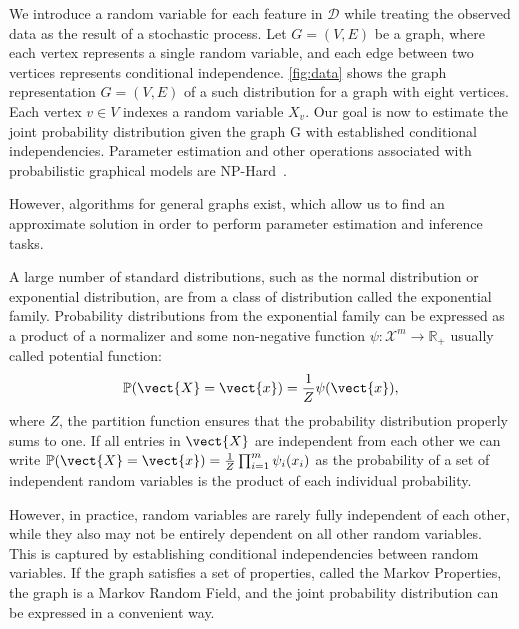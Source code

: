 



We introduce a random variable for each feature in $\mathcal{D}$ while treating the observed data as the result of a stochastic process.
Let $G=(V,E)$ be a graph, where each vertex represents a single random variable, and each edge between two vertices represents conditional independence. 
\fig \ref{fig:data} shows the graph representation $G=(V,E)$ of a such distribution for a graph with eight vertices. 
Each vertex $ v \in V$ indexes a random variable $X_v$.
Our goal is now to estimate the joint probability distribution given the graph G with established conditional independencies.
Parameter estimation and other operations associated with probabilistic graphical models are NP-Hard~\cite{cooper1990computational}.

However, algorithms for general graphs exist, which allow us to find an approximate solution in order to perform parameter estimation and inference tasks.

A large number of standard distributions, such as the normal distribution or exponential distribution, are from a class of distribution called the exponential family.
Probability distributions from the exponential family can be expressed as a product of a normalizer and some non-negative function $\psi: \mathcal{X}^m \rightarrow \mathbb{R}_+$ usually called potential function:
\begin{equation}
    \label{eq:probpot}
    \mathbb{P}(\vect{X} = \vect{x}) = \frac{1}{Z} \psi(\vect{x}),
\end{equation}
where $Z$, the partition function ensures that the probability distribution properly sums to one.
If all entries in $\vect{X}$ are independent from each other we can write $\mathbb{P}(\vect{X} = \vect{x}) = \frac{1}{Z} \prod_{i=1}^m \psi_i(x_i)$ as the probability of a set of independent random variables is the product of each individual probability.


However, in practice, random variables are rarely fully independent of each other, while they also may not be entirely dependent on all other random variables.
This is captured by establishing conditional independencies between random variables.
If the graph satisfies a set of properties, called the Markov Properties, the graph is a Markov Random Field, and the joint probability distribution can be expressed in a convenient way.

